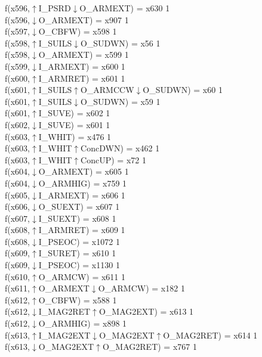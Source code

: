 f(x596,$\uparrow$I\_PSRD$\downarrow$O\_ARMEXT) = x630 {1} \\
f(x596,$\downarrow$O\_ARMEXT) = x907 {1} \\
f(x597,$\downarrow$O\_CBFW) = x598 {1} \\
f(x598,$\uparrow$I\_SUILS$\downarrow$O\_SUDWN) = x56 {1} \\
f(x598,$\downarrow$O\_ARMEXT) = x599 {1} \\
f(x599,$\downarrow$I\_ARMEXT) = x600 {1} \\
f(x600,$\uparrow$I\_ARMRET) = x601 {1} \\
f(x601,$\uparrow$I\_SUILS$\uparrow$O\_ARMCCW$\downarrow$O\_SUDWN) = x60 {1} \\
f(x601,$\uparrow$I\_SUILS$\downarrow$O\_SUDWN) = x59 {1} \\
f(x601,$\uparrow$I\_SUVE) = x602 {1} \\
f(x602,$\downarrow$I\_SUVE) = x601 {1} \\
f(x603,$\uparrow$I\_WHIT) = x476 {1} \\
f(x603,$\uparrow$I\_WHIT$\uparrow$ConcDWN) = x462 {1} \\
f(x603,$\uparrow$I\_WHIT$\uparrow$ConcUP) = x72 {1} \\
f(x604,$\downarrow$O\_ARMEXT) = x605 {1} \\
f(x604,$\downarrow$O\_ARMHIG) = x759 {1} \\
f(x605,$\downarrow$I\_ARMEXT) = x606 {1} \\
f(x606,$\downarrow$O\_SUEXT) = x607 {1} \\
f(x607,$\downarrow$I\_SUEXT) = x608 {1} \\
f(x608,$\uparrow$I\_ARMRET) = x609 {1} \\
f(x608,$\downarrow$I\_PSEOC) = x1072 {1} \\
f(x609,$\uparrow$I\_SURET) = x610 {1} \\
f(x609,$\downarrow$I\_PSEOC) = x1130 {1} \\
f(x610,$\uparrow$O\_ARMCW) = x611 {1} \\
f(x611,$\uparrow$O\_ARMEXT$\downarrow$O\_ARMCW) = x182 {1} \\
f(x612,$\uparrow$O\_CBFW) = x588 {1} \\
f(x612,$\downarrow$I\_MAG2RET$\uparrow$O\_MAG2EXT) = x613 {1} \\
f(x612,$\downarrow$O\_ARMHIG) = x898 {1} \\
f(x613,$\uparrow$I\_MAG2EXT$\downarrow$O\_MAG2EXT$\uparrow$O\_MAG2RET) = x614 {1} \\
f(x613,$\downarrow$O\_MAG2EXT$\uparrow$O\_MAG2RET) = x767 {1} \\
